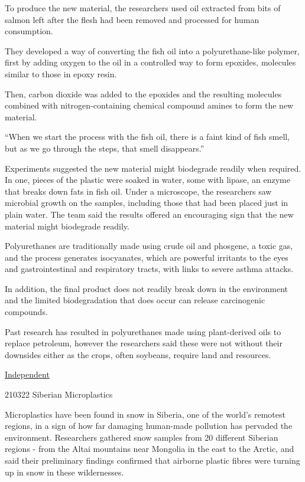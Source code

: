 \documentclass[
]{book}
\begin{document}
To produce the new material, the researchers used oil extracted from bits of salmon left after the flesh had been removed and processed for human consumption.

They developed a way of converting the fish oil into a polyurethane-like polymer, first by adding oxygen to the oil in a controlled way to form epoxides, molecules similar to those in epoxy resin.

Then, carbon dioxide was added to the epoxides and the resulting molecules combined with nitrogen-containing chemical compound amines to form the new material.

``When we start the process with the fish oil, there is a faint kind of fish smell, but as we go through the steps, that smell disappears.''

Experiments suggested the new material might biodegrade readily when required.
In one, pieces of the plastic were soaked in water, some with lipase, an enzyme that breaks down fats in fish oil.
Under a microscope, the researchers saw microbial growth on the samples, including those that had been placed just in plain water. The team said the results offered an encouraging sign that the new material might biodegrade readily.

Polyurethanes are traditionally made using crude oil and phosgene, a toxic gas, and the process generates isocyanates, which are powerful irritants to the eyes and gastrointestinal and respiratory tracts, with links to severe asthma attacks.

In addition, the final product does not readily break down in the environment and the limited biodegradation that does occur can release carcinogenic compounds.

Past research has resulted in polyurethanes made using plant-derived oils to replace petroleum, however the researchers said these were not without their downsides either as the crops, often soybeans, require land and resources.

\href{https://www.independent.co.uk/news/science/plastic-fish-waste-biodegradable-study-b1826844.html}{Independent}

210322 Siberian Microplastics

Microplastics have been found in snow in Siberia, one of the world's remotest regions, in a sign of how far damaging human-made pollution has pervaded the environment.
Researchers gathered snow samples from 20 different Siberian regions - from the Altai mountains near Mongolia in the east to the Arctic, and said their preliminary findings confirmed that airborne plastic fibres were turning up in snow in these wildernesses.
\end{document}
